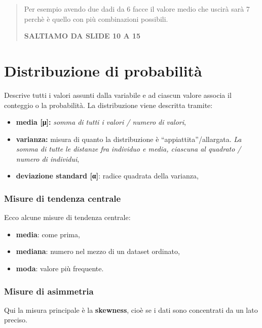 \begin{quote}
Per esempio avendo due dadi da 6 facce il valore medio che uscirà sarà 7
perchè è quello con più combinazioni possibili.

\textbf{SALTIAMO DA SLIDE 10 A 15}
\end{quote}

\section{Distribuzione di
probabilità}\label{distribuzione-di-probabilituxe0}

Descrive tutti i valori assunti dalla variabile e ad ciascun valore
associa il conteggio o la probabilità. La distribuzione viene descritta
tramite:

\begin{itemize}
\item
  \textbf{media {[}μ{]}:} \emph{somma di tutti i valori / numero di
  valori},
\item
  \textbf{varianza:} misura di quanto la distribuzione è
  ``appiattita''/allargata. \emph{La somma di tutte le distanze fra
  individuo e media, ciascuna al quadrato / numero di individui},
\item
  \textbf{deviazione standard {[}α{]}}: radice quadrata della varianza,
\end{itemize}

\subsubsection{Misure di tendenza
centrale}\label{misure-di-tendenza-centrale}

Ecco alcune misure di tendenza centrale:

\begin{itemize}
\item
  \textbf{media}: come prima,
\item
  \textbf{mediana}: numero nel mezzo di un dataset ordinato,
\item
  \textbf{moda}: valore più frequente.
\end{itemize}

\subsubsection{Misure di asimmetria}\label{misure-di-asimmetria}

Qui la misura principale è la \textbf{skewness}, cioè se i dati sono
concentrati da un lato preciso.

